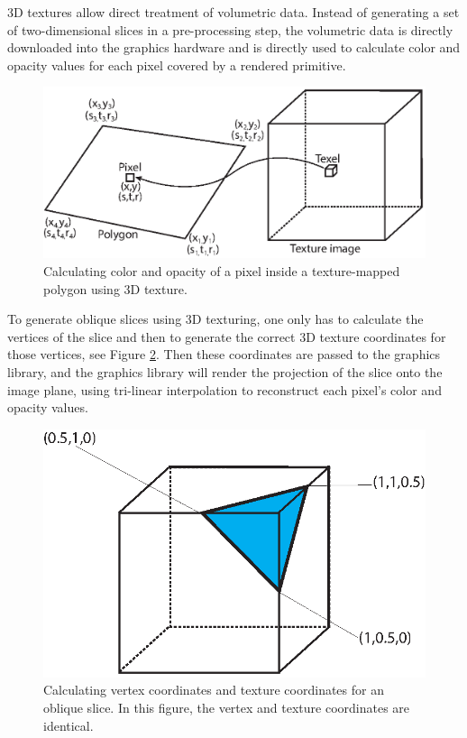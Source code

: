 3D textures allow direct treatment of volumetric data. Instead of generating a set of two-dimensional slices in a pre-processing step, the volumetric data is directly downloaded into the graphics hardware and is directly used to calculate color and opacity values for each pixel covered by a rendered primitive.

\begin{figure}[th]
\centering
\includegraphics{Figures/3dtexmapping}
\decoRule
\caption[3D texture mapping]{Calculating color and opacity of a pixel inside a texture-mapped polygon using 3D texture.}
\label{fig:3dtexture}
\end{figure}


To generate oblique slices using 3D texturing, one only has to calculate the vertices of the slice and then to generate the correct 3D texture coordinates for those vertices, see Figure \ref{fig:cubeSlice}. Then these coordinates are passed to the graphics library, and the graphics library will render the projection of the slice onto the image plane, using tri-linear interpolation to reconstruct each pixel's color and opacity values.

\begin{figure}[th]
\centering
\includegraphics{Figures/cubeSlice}
\decoRule
\caption[3D Cube slice]{Calculating vertex coordinates and texture coordinates for an oblique slice. In this figure, the vertex and texture coordinates are identical.}
\label{fig:cubeSlice}
\end{figure}


